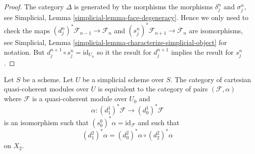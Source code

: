\begin{proof}
The category $\Delta$ is generated by the morphisms
the morphisms $\delta^n_j$ and $\sigma^n_j$, see
Simplicial, Lemma \ref{simplicial-lemma-face-degeneracy}.
Hence we only need to check the maps
$(d^n_j)^*\mathcal{F}_{n - 1} \to \mathcal{F}_n$
and $(s^n_j)^*\mathcal{F}_{n + 1} \to \mathcal{F}_n$ are
isomorphisms, see
Simplicial, Lemma \ref{simplicial-lemma-characterize-simplicial-object}
for notation. But $d_j^{n + 1} \circ s^n_j = \text{id}_{U_n}$
so it the result for $d^{n + 1}_j$ implies the result
for $s^n_j$.
\end{proof}

\begin{lemma}
\label{lemma-characterize-cartesian-modules}
Let $S$ be a scheme. Let $U$ be a simplicial scheme over $S$.
The category of cartesian quasi-coherent modules over $U$
is equivalent to the category of pairs $(\mathcal{F}, \alpha)$
where $\mathcal{F}$ is a quasi-coherent module over $U_0$
and
$$
\alpha : (d_1^1)^*\mathcal{F} \longrightarrow (d_0^1)^*\mathcal{F}
$$
is an isomorphism such that $(s_0^0)^*\alpha = \text{id}_\mathcal{F}$
and such that
$$
(d^2_1)^*\alpha = (d^2_0)^*\alpha \circ (d^2_2)^*\alpha
$$
on $X_2$.
\end{lemma}

